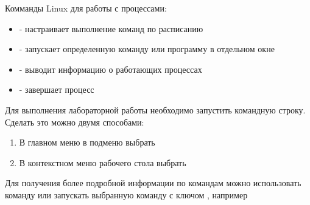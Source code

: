 \documentclass[a4paper,12pt]{article}
\begin{document}
  
  \begin{flushleft}
    Комманды Linux для работы с процессами:
    \begin{itemize}
      \item {} - настраивает выполнение команд по расписанию
      \item {} - запускает определенную команду или программу в отдельном окне
      \item {} - выводит информацию о работающих процессах
      \item {} - завершает процесс
    \end{itemize}
  \end{flushleft}
  
  \begin{flushleft}
    Для выполнения лабораторной работы необходимо запустить командную строку. Сделать это можно двумя способами:
    \begin{enumerate}
      \item В главном меню в подменю  выбрать 
      \item В контекстном меню рабочего стола выбрать 
    \end{enumerate}
  \end{flushleft}
  
  \begin{flushleft}
    Для получения более подробной информации по командам можно использовать команду  или запускать выбранную команду с ключом , например  \linebreak
  \end{flushleft}
\end{document}
